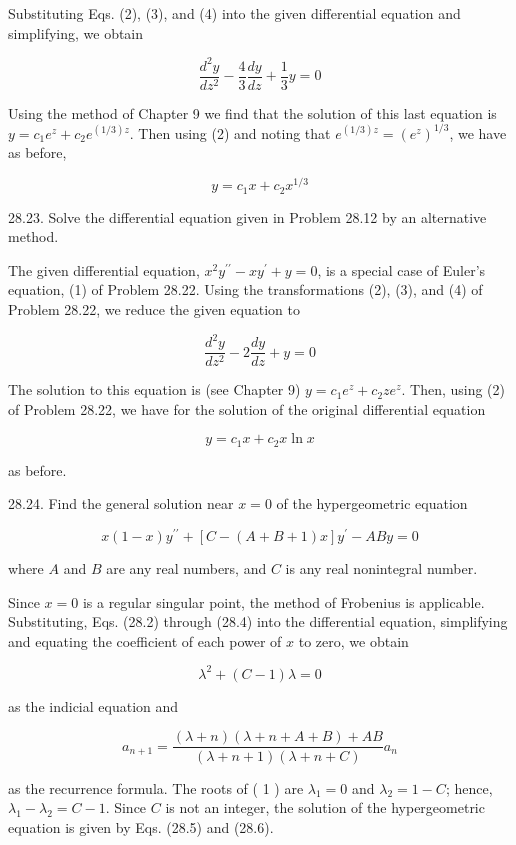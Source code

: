\documentclass[10pt]{article}
\begin{document}
Substituting Eqs. (2), (3), and (4) into the given differential equation and simplifying, we obtain

$$
\frac{d^{2} y}{d z^{2}}-\frac{4}{3} \frac{d y}{d z}+\frac{1}{3} y=0
$$

Using the method of Chapter 9 we find that the solution of this last equation is $y=c_{1} e^{z}+c_{2} e^{(1 / 3) z}$. Then using (2) and noting that $e^{(1 / 3) z}=\left(e^{z}\right)^{1 / 3}$, we have as before,

$$
y=c_{1} x+c_{2} x^{1 / 3}
$$

28.23. Solve the differential equation given in Problem 28.12 by an alternative method.

The given differential equation, $x^{2} y^{\prime \prime}-x y^{\prime}+y=0$, is a special case of Euler's equation, (1) of Problem 28.22. Using the transformations (2), (3), and (4) of Problem 28.22, we reduce the given equation to

$$
\frac{d^{2} y}{d z^{2}}-2 \frac{d y}{d z}+y=0
$$

The solution to this equation is (see Chapter 9) $y=c_{1} e^{z}+c_{2} z e^{z}$. Then, using (2) of Problem 28.22, we have for the solution of the original differential equation

$$
y=c_{1} x+c_{2} x \ln x
$$

as before.

28.24. Find the general solution near $x=0$ of the hypergeometric equation

$$
x(1-x) y^{\prime \prime}+[C-(A+B+1) x] y^{\prime}-A B y=0
$$

where $A$ and $B$ are any real numbers, and $C$ is any real nonintegral number.

Since $x=0$ is a regular singular point, the method of Frobenius is applicable. Substituting, Eqs. (28.2) through (28.4) into the differential equation, simplifying and equating the coefficient of each power of $x$ to zero, we obtain


\begin{equation*}
\lambda^{2}+(C-1) \lambda=0 \tag{1}
\end{equation*}


as the indicial equation and


\begin{equation*}
a_{n+1}=\frac{(\lambda+n)(\lambda+n+A+B)+A B}{(\lambda+n+1)(\lambda+n+C)} a_{n} \tag{2}
\end{equation*}


as the recurrence formula. The roots of ( 1 ) are $\lambda_{1}=0$ and $\lambda_{2}=1-C$; hence, $\lambda_{1}-\lambda_{2}=C-1$. Since $C$ is not an integer, the solution of the hypergeometric equation is given by Eqs. (28.5) and (28.6).
\end{document}
